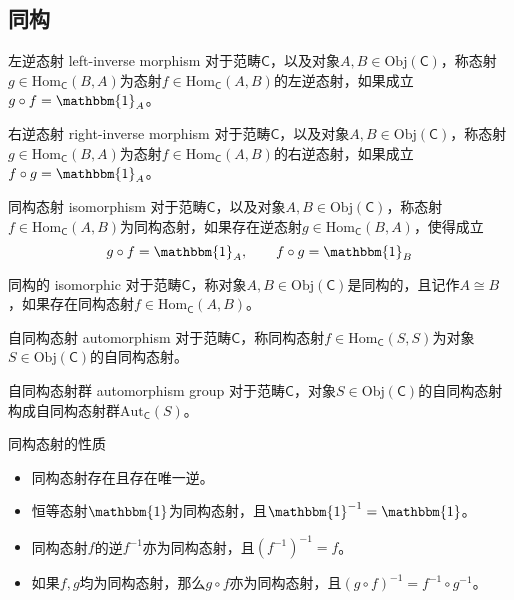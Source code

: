 \subsection{同构}

\begin{definition}{左逆态射 left-inverse morphism}
	对于范畴$\mathsf{C}$，以及对象$A,B\in\mathrm{Obj}(\mathsf{C})$，称态射$g\in\mathrm{Hom}_\mathsf{C}(B,A)$为态射$f\in\mathrm{Hom}_\mathsf{C}(A,B)$的左逆态射，如果成立$g\circ f=\mathbbm{1}_A$。
\end{definition}

\begin{definition}{右逆态射 right-inverse morphism}
	对于范畴$\mathsf{C}$，以及对象$A,B\in\mathrm{Obj}(\mathsf{C})$，称态射$g\in\mathrm{Hom}_\mathsf{C}(B,A)$为态射$f\in\mathrm{Hom}_\mathsf{C}(A,B)$的右逆态射，如果成立$f\circ g=\mathbbm{1}_A$。
\end{definition}

\begin{definition}{同构态射 isomorphism}
	对于范畴$\mathsf{C}$，以及对象$A,B\in\mathrm{Obj}(\mathsf{C})$，称态射$f\in\mathrm{Hom}_\mathsf{C}(A,B)$为同构态射，如果存在逆态射$g\in\mathrm{Hom}_\mathsf{C}(B,A)$，使得成立
	$$
	g\circ f=\mathbbm{1}_A,\qquad f\circ g=\mathbbm{1}_B
	$$
\end{definition}

\begin{definition}{同构的 isomorphic}
	对于范畴$\mathsf{C}$，称对象$A,B\in\mathrm{Obj}(\mathsf{C})$是同构的，且记作$A\cong B$，如果存在同构态射$f\in\mathrm{Hom}_\mathsf{C}(A,B)$。
\end{definition}

\begin{definition}{自同构态射 automorphism}
	对于范畴$\mathsf{C}$，称同构态射$f\in\mathrm{Hom}_\mathsf{C}(S,S)$为对象$S\in\mathrm{Obj}(\mathsf{C})$的自同构态射。
\end{definition}

\begin{definition}{自同构态射群 automorphism group}
	对于范畴$\mathsf{C}$，对象$S\in\mathrm{Obj}(\mathsf{C})$的自同构态射构成自同构态射群$\mathrm{Aut}_\mathsf{C}(S)$。
\end{definition}

\begin{proposition}{同构态射的性质}
	\begin{itemize}
		\item 同构态射存在且存在唯一逆。
		\item 恒等态射$\mathbbm{1}$为同构态射，且$\mathbbm{1}^{-1}=\mathbbm{1}$。
		\item 同构态射$f$的逆$f^{-1}$亦为同构态射，且$(f^{-1})^{-1}=f$。
		\item 如果$f,g$均为同构态射，那么$g\circ f$亦为同构态射，且$(g\circ f)^{-1}=f^{-1}\circ g^{-1}$。
	\end{itemize}
\end{proposition}

